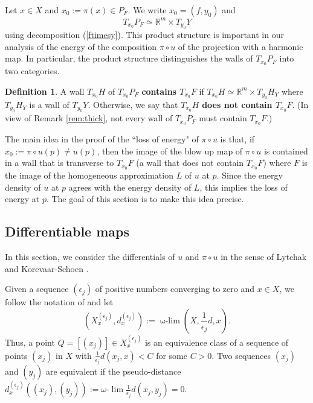 \documentclass[12pt]{amsart}
\theoremstyle{definition}
\newtheorem{definition}[theorem]{Definition}
\numberwithin{equation}{section}
\newcommand{\R}{\mathbb R}
\newcommand{\ee}{{(\epsilon_j)}}
\newcommand{\PF}{P_F}
\newcommand\wlim{\mathop{\mbox{$\omega$-$\lim$}}}
\begin{document}
Let $x \in X$ and $x_0 := \pi(x) \in \PF$.  
We write  $x_0=(f,y_0)$ and 
$$
T_{x_0}\PF \simeq \R^m  \times T_{y_0}Y
$$ 
using decomposition (\ref{ftimesy}).  {This product structure is important in our analysis of the energy of the composition $\pi \circ u$ of the projection with a harmonic map.  In particular, the product structure distinguishes the walls of $T_{x_0}\PF$ into two categories.
}   

\begin{definition} \label{categories}
A wall $T_{x_0}H$ of  $T_{x_0}\PF$  
{\bf contains $T_{x_0}F$} if $T_{x_0}H \simeq\R^m \times T_{y_0}H_Y$ where $T_{y_0}H_Y$ is a wall of $T_{y_0}Y$.  Otherwise, we say that $T_{x_0}H$  {\bf does not contain $T_{x_0}F$}. 
(In view of Remark \ref{rem:thick}, not every wall of $T_{x_0}\PF$ must contain $T_{x_0}F$.)

\end{definition}

{The main idea in the proof of the  ``loss of energy" of $\pi \circ u$ is that, if $x_0:=\pi \circ u(p) \neq u(p)$, then the image of the blow up map of $\pi \circ u$ is contained in a wall that is transverse to $T_{x_0}F$ (a wall that does not contain $T_{x_0}F$) where $F$ is the image of the homogeneous approximation $L$ of $u$ at $p$.   Since the energy density of $u$ at $p$ agrees with the energy density of $L$, this implies the loss of energy at $p$.  The goal of this section is to make this idea precise.} 





\subsection{Differentiable maps}
 \label{sec:differentials}
 In this section, we consider the differentials of $u$ and $\pi\circ u$ in the sense of Lytchak \cite{lytchak} and Korevaar-Schoen \cite{korevaar-schoen1}. 
   
Given a sequence $\ee$ of positive numbers converging to zero and $x \in X$, we follow the notation of \cite{lytchak} and let
\begin{equation}\label{eq:ee}
(X_x^\ee, d_x^\ee):=\wlim\left(X,\frac{1}{\epsilon_j}d, x\right).
\end{equation}
Thus, a  point $Q=[(x_j)] \in X_x^\ee$ is an equivalence class  of a sequence of points $(x_j)$ in $X$ with $\frac{1}{\epsilon_j}d(x_j ,x)<C$ for some $C>0$.  Two sequences $(x_j)$ and $(y_j)$ are equivalent if the pseudo-distance $d_x^\ee((x_j), (y_j)):=\omega\mbox{-}\lim \frac{1}{\epsilon_j} d(x_j, y_j)=0$.
\end{document}
